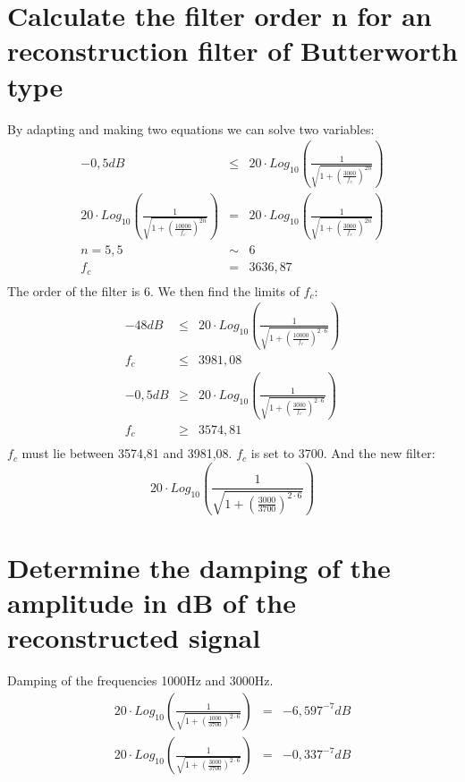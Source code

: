 \documentclass[a4wide,10pt]{article}
\begin{document}
\section{Calculate the filter order n for an reconstruction filter of Butterworth type} %
\label{sec:calculate_the_filter_order_n_for_an_reconstruction_filter_of_butterworth_type}
By adapting and making two equations we can solve two variables:
\begin{eqnarray}
	-0,5dB &\leq& 20 \cdot Log_{10}(\frac{1}{\sqrt{1+(\frac{3000}{f_c})^{2n}}}) \nonumber \\
	20 \cdot Log_{10}(\frac{1}{\sqrt{1+(\frac{10000}{f_c})^{2n}}}) &=& 20 \cdot Log_{10}(\frac{1}{\sqrt{1+(\frac{3000}{f_c})^{2n}}}) \nonumber \\ \nonumber
	n = 5,5 &\sim& 6 \nonumber \\
	f_c &=& 3636,87 \nonumber \\
\end{eqnarray}
The order of the filter is 6.
We then find the limits of $f_c$:
\begin{eqnarray}
	-48dB &\leq& 20 \cdot Log_{10}(\frac{1}{\sqrt{1+(\frac{10000}{f_c})^{2 \cdot 6}}}) \nonumber \\
	f_c &\leq& 3981,08 \nonumber \\
	-0,5dB &\geq& 20 \cdot Log_{10}(\frac{1}{\sqrt{1+(\frac{3000}{f_c})^{2 \cdot 6}}}) \nonumber \\
	f_c &\geq& 3574,81 \nonumber \\
\end{eqnarray}
$f_c$ must lie between 3574,81 and 3981,08. $f_c$ is set to 3700.
And the new filter:
\begin{equation}
	20 \cdot Log_{10}(\frac{1}{\sqrt{1+(\frac{3000}{3700})^{2 \cdot 6}}})
\end{equation}

\section{Determine the damping of the amplitude in dB of the reconstructed signal} %
\label{sec:determine_the_damping_of_the_amplitude_in_db_of_the_reconstructed_signal}
Damping of the frequencies 1000Hz and 3000Hz.
\begin{eqnarray}
	20 \cdot Log_{10}(\frac{1}{\sqrt{1+(\frac{1000}{3700})^{2 \cdot 6}}}) &=& -6,597^{-7}dB \nonumber \\
	20 \cdot Log_{10}(\frac{1}{\sqrt{1+(\frac{3000}{3700})^{2 \cdot 6}}}) &=& -0,337^{-7}dB \nonumber \\
\end{eqnarray}
\end{document}
